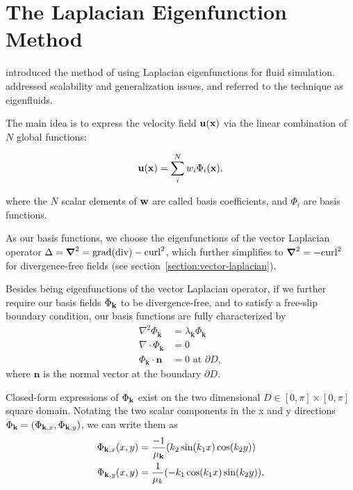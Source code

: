 
\section{The Laplacian Eigenfunction Method}
\label{section:laplacian-eigenfluids}
\cite{dewitt} introduced the method of using Laplacian eigenfunctions for fluid
simulation. \cite{scalable-eigenfluids} addressed scalability and generalization
issues, and referred to the technique as eigenfluids. 

The main idea is to express the velocity field $\vb{u}(\vb{x})$ via the linear
combination of $N$ global functions:

$$\vb{u}(\vb{x})=\sum_i^N w_i \Phi_i(\vb{x}),$$

where the $N$ scalar elements of $\vb{w}$ are called basis coefficients, and
${\Phi_i}$ are basis functions.

As our basis functions, we choose the eigenfunctions of the vector Laplacian
operator $\Delta = \grad^2 = \text{grad}(\text{div}) - \text{curl}^2$, which
further simplifies to $\grad^2 = -\text{curl}^2$ for divergence-free fields (see
section~\ref{section:vector-laplacian}). 

Besides being eigenfunctions of the vector Laplacian operator, if we further
require our basis fields $\Phi_{\vb{k}}$ to be divergence-free, and to satisfy
a free-slip boundary condition, our basis functions are fully characterized by
\begin{align*}
\nabla^2 \Phi_{\textbf{k}} &= \lambda_{\textbf{k}}\Phi_{\textbf{k}} \\
\nabla \cdot \Phi_{\textbf{k}} &= 0 \\
\Phi_{\textbf{k}} \cdot \textbf{n} &= 0 \text{ at } \partial D,
\end{align*}
where $\textbf{n}$ is the normal vector at the boundary $\partial D$.

Closed-form expressions of $\Phi_{\vb{k}}$ exist on the two dimensional $D \in
[0, \pi] \times [0, \pi]$ square domain.  Notating the two scalar
components in the x and y directions $\Phi_{\vb{k}} =(\Phi_{\vb{k}, x},
\Phi_{\vb{k},y})$, we can write them as
\begin{align}
    \Phi_{\textbf{k},x}(x, y) &= \frac{-1}{\mu_{\vb{k}}}
    ( k_2 \sin(k_1 x) \cos(k_2 y) ) \\
    \Phi_{\textbf{k},y}(x, y) &= \frac{1}{\mu_{k}}
    ( -k_1 \cos(k_1 x) \sin(k_2 y) ),
\end{align}


